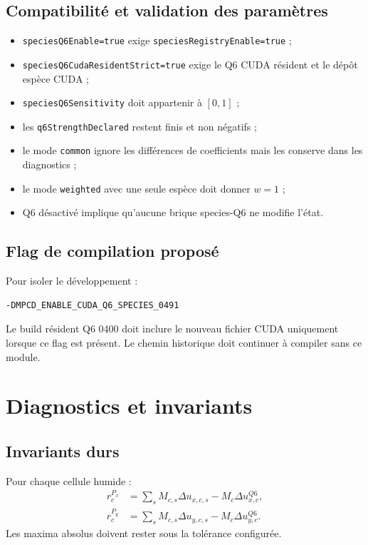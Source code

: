 \documentclass[11pt,a4paper]{article}
\newcommand{\code}[1]{\texttt{#1}}
\begin{document}
\subsection{Compatibilité et validation des paramètres}

\begin{itemize}
  \item \code{speciesQ6Enable=true} exige \code{speciesRegistryEnable=true} ;
  \item \code{speciesQ6CudaResidentStrict=true} exige le Q6 CUDA résident et le dépôt espèce CUDA ;
  \item \code{speciesQ6Sensitivity} doit appartenir à \([0,1]\) ;
  \item les \code{q6StrengthDeclared} restent finis et non négatifs ;
  \item le mode \code{common} ignore les différences de coefficients mais les conserve dans les diagnostics ;
  \item le mode \code{weighted} avec une seule espèce doit donner \(w=1\) ;
  \item Q6 désactivé implique qu'aucune brique species-Q6 ne modifie l'état.
\end{itemize}

\subsection{Flag de compilation proposé}

Pour isoler le développement :
\begin{lstlisting}
-DMPCD_ENABLE_CUDA_Q6_SPECIES_0491
\end{lstlisting}

Le build résident Q6 0400 doit inclure le nouveau fichier CUDA uniquement lorsque ce flag est présent. Le chemin historique doit continuer à compiler sans ce module.

\section{Diagnostics et invariants}

\subsection{Invariants durs}

Pour chaque cellule humide :
\begin{align}
  r^{P_x}_c &= \sum_s M_{c,s}\Delta u_{x,c,s}-M_c\Delta u^{Q6}_{x,c}, \\
  r^{P_y}_c &= \sum_s M_{c,s}\Delta u_{y,c,s}-M_c\Delta u^{Q6}_{y,c}.
\end{align}
Les maxima absolus doivent rester sous la tolérance configurée.
\end{document}
